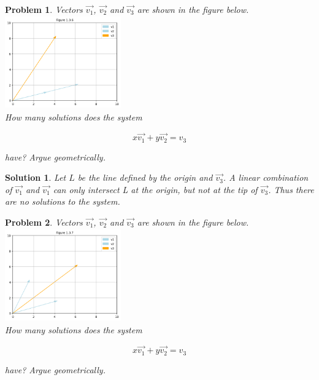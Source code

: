 \documentclass{article}
\newtheorem{problem}{Problem}
\newtheorem*{solution}{Solution}
\begin{document}
\begin{problem}
Vectors $\vec{v_{1}}$, $\vec{v_{2}}$ and $\vec{v_{3}}$ are shown in the figure below. \\

\includegraphics[width=5cm, height=4cm]{problem1.3.6} \\

How many solutions does the system

\begin{equation*}
x\vec{v_{1}} + y\vec{v_{2}} = v_{3}
\end{equation*}

have? Argue geometrically.
\end{problem}

\begin{solution}
Let $L$ be the line defined by the origin and $\vec{v_{3}}$. A linear combination of $\vec{v_{1}}$ and $\vec{v_{1}}$ can only intersect L at the origin, but not at the tip of $\vec{v_{3}}$. Thus there are no solutions to the system.
\end{solution}

\begin{problem}
Vectors $\vec{v_{1}}$, $\vec{v_{2}}$ and $\vec{v_{3}}$ are shown in the figure below. \\

\includegraphics[width=5cm, height=4cm]{problem1.3.7} \\

How many solutions does the system

\begin{equation*}
x\vec{v_{1}} + y\vec{v_{2}} = v_{3}
\end{equation*}

have? Argue geometrically.
\end{problem}
\end{document}
